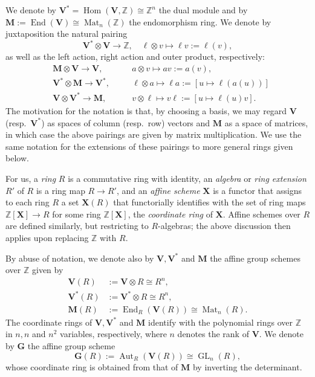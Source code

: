 \documentclass[reqno]{amsart}
\DeclareMathOperator{\Mat}{Mat}
\DeclareMathOperator{\GL}{GL}
\DeclareMathOperator{\Hom}{Hom}
\DeclareMathOperator{\End}{End}
\DeclareMathOperator{\Aut}{Aut}
\theoremstyle{plain} \newtheorem{theorem} {Theorem} \newtheorem{conjecture} {Conjecture} \newtheorem{corollary} [theorem] {Corollary} \newtheorem{proposition} [theorem] {Proposition} \newtheorem{fact} [theorem] {Fact}
\theoremstyle{definition} \newtheorem{definition} [theorem] {Definition}
\theoremstyle{itplain} %
\begin{document}
We denote by $\mathbf{V}^* = \Hom(\mathbf{V},\mathbb{Z}) \cong \mathbb{Z}^n$ the dual module and by $\mathbf{M} := \End(\mathbf{V}) \cong \Mat_n(\mathbb{Z})$ the endomorphism ring.  We denote by juxtaposition the natural pairing
\begin{equation*}
  \mathbf{V}^* \otimes \mathbf{V} \rightarrow \mathbb{Z}, \quad \ell \otimes v \mapsto \ell v := \ell(v),
\end{equation*}
as well as the left action, right action and outer product, respectively:
\begin{align*}
  &\mathbf{M} \otimes \mathbf{V} \rightarrow \mathbf{V}, \quad   &&a \otimes v \mapsto a v := a(v), \\
  &\mathbf{V}^* \otimes \mathbf{M} \rightarrow \mathbf{V}^*, \quad  &&\ell \otimes a \mapsto \ell a := [u \mapsto \ell(a(u))] \\
  &\mathbf{V} \otimes \mathbf{V}^* \rightarrow \mathbf{M}, \quad &&v \otimes \ell \mapsto v \ell := [u \mapsto \ell(u) v]. 
\end{align*}
The motivation for the notation is that, by choosing a basis, we may regard $\mathbf{V}$ (resp.\ $\mathbf{V}^*$) as spaces of column (resp.\ row) vectors and $\mathbf{M}$ as a space of matrices, in which case the above pairings are given by matrix multiplication.  We use the same notation for the extensions of these pairings to more general rings given below.

For us, a \emph{ring} $R$ is a commutative ring with identity, an \emph{algebra} or \emph{ring extension} $R'$ of $R$ is a ring map $R \rightarrow R'$, and an \emph{affine scheme} $\mathbf{X}$ is a functor that assigns to each ring $R$ a set $\mathbf{X}(R)$ that functorially identifies with the set of ring maps $\mathbb{Z}[\mathbf{X}] \rightarrow R$ for some ring $\mathbb{Z}[\mathbf{X}]$, the \emph{coordinate ring} of $\mathbf{X}$.  Affine schemes over $R$ are defined similarly, but restricting to $R$-algebras; the above discussion then applies upon replacing $\mathbb{Z}$ with $R$.

By abuse of notation, we denote also by $\mathbf{V}, \mathbf{V}^*$ and $\mathbf{M}$ the affine group schemes over $\mathbb{Z}$ given by
\begin{align*}
  \mathbf{V}(R) &:= \mathbf{V} \otimes R \cong R^n, \\
  \mathbf{V}^*(R) &:= \mathbf{V}^* \otimes R \cong R^n, \\
  \mathbf{M}(R) &:= \End_R(\mathbf{V}(R)) \cong \Mat_n(R).
\end{align*}
The coordinate rings of $\mathbf{V}, \mathbf{V}^*$ and $\mathbf{M}$ identify with the polynomial rings over $\mathbb{Z}$ in $n, n$ and $n^2$ variables, respectively, where $n$ denotes the rank of $\mathbf{V}$.  We denote by $\mathbf{G}$ the affine group scheme
\begin{equation*}
  \mathbf{G}(R) := \Aut_R(\mathbf{V}(R)) \cong \GL_n(R),
\end{equation*}
whose coordinate ring is obtained from that of $\mathbf{M}$ by inverting the determinant.
\end{document}

